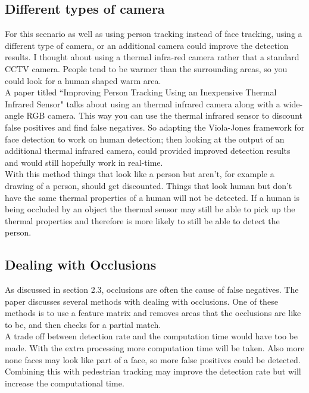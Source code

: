 \documentclass[10pt,a4paper,openbib]{article}
\begin{document}
\begin{multicols}{2}
\subsection{Different types of camera}

For this scenario as well as using person tracking instead of face tracking, using a different type of camera, or an additional camera could improve the detection results. I thought about using a thermal infra-red camera rather that a standard CCTV camera. People tend to be warmer than the surrounding areas, so you could look for a human shaped warm area. \\

\noindent A paper titled ``Improving Person Tracking Using an Inexpensive Thermal Infrared Sensor"\cite{thermal} talks about using an thermal infrared camera along with a wide-angle RGB camera. This way you can use the thermal infrared sensor to discount false positives and find false negatives. So adapting the Viola-Jones framework\cite{violaJones} for face detection to work on human detection; then looking at the output of an additional thermal infrared camera, could provided improved detection results and would still hopefully work in real-time.\\

\noindent With this method things that look like a person but aren't, for example a drawing of a person, should get discounted. Things that look human but don't have the same thermal properties of a human will not be detected. If a human is being occluded by an object the thermal sensor may still be able to pick up the thermal properties and therefore is more likely to still be able to detect the person. 

\subsection{Dealing with Occlusions}
As discussed in section 2.3, occlusions are often the cause of false negatives. The \cite{occlusions} paper discusses several methods with dealing with occlusions. One of these methods is to use a feature matrix and removes areas that the occlusions are like to be, and then checks for a partial match. \\

 \noindent A trade off between detection rate and the computation time would have too be made. With the extra processing more computation time will be taken. Also more none faces may look like part of a face, so more false positives could be detected. Combining this with pedestrian tracking may improve the detection rate but will increase the computational time.
 

\end{multicols}
\end{document}
